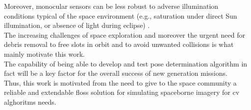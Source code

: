Moreover, monocular sensors can be less robust to adverse illumination conditions typical of the space environment \cite{Volpe2017} (e.g., saturation under direct Sun illumination, or absence of light during eclipse) \cite{pesciolino}.\\
The increasing challenges of space exploration and moreover the urgent need for debris removal to free slots in orbit and to avoid unwanted collisions is what mainly motivate this work.\\
The capability of being able to develop and test pose determination algorithm in fact will be a key factor for the overall success of new generation missions.\\
Thus, this work is motivated from the need to give to the space community a reliable and extendable \acrfull{floss} solution for simulating spaceborne imagery for \acrfull{cv} alghoritms needs.
